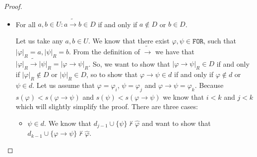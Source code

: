 \documentclass{article}
\theoremstyle{definition}
\theoremstyle{definition}
\theoremstyle{definition}
\newcommand*{\ra}{\rightarrow}
\newcommand*{\FOR}{\texttt{FOR}}
\newcommand{\PC}{$\mathsf{PC}$\xspace}
\begin{document}
\begin{proof}
\begin{itemize}
\begin{itemize}
                        Let us take the proof of $\lnot \varphi \ra \hat{\varphi}$ in $d_{j-1}$ and
                        append to it the proof of $\varphi \ra \hat{\varphi}$ creating a sequence
                        $\Psi$. Then let us append to $\Psi$ a formula $(\varphi \ra \hat{\varphi}) \ra
                            ((\lnot \varphi \ra \hat{\varphi} ) \ra \hat \varphi)$, which is an instance of
                        a \PC axiom $(\alpha \ra \beta) \ra ((\lnot \alpha \ra \beta) \ra \beta)$.
                        Then, by \emph{modus ponens} we can infer $(\lnot \varphi \ra \hat{\varphi} )
                            \ra \hat \varphi$ and then $\hat{\varphi}$ thus proving that $d_{j-1} \vdash
                            \hat{\varphi}$. But this is a contradiction, because we know that $d_{j-1} \not
                            \vdash \hat{\varphi}$. So our assumption that $d_{j-1} \cup \{\lnot \varphi\}
                            \vdash \hat{\varphi}$ was false, so $\varphi_j \in d_j$.
              \end{itemize}

              We can see that if $i > j$ the proof will be analogous.

        \item For all $a, b \in U: a \tilde{\ra}b \in D$ if and only if $a \not \in D$ or $b
                  \in D$.

              Let us take any $a, b \in U$. We know that there exist $\varphi, \psi \in
                  \FOR$, such that $|\varphi|_R = a, |\psi|_R = b$. From the definition of
              $\tilde{\ra}$ we have that $|\varphi|_R \tilde{\ra} |\psi|_R = |\varphi \ra
                  \psi|_R$. So, we want to show that $|\varphi \ra \psi|_R \in D$ if and only if
              $|\varphi|_R \not \in D$ or $|\psi|_R \in D$, so to show that $\varphi \ra \psi
                  \in d$ if and only if $\varphi \not \in d$ or $\psi \in d$. Let us assume that
              $\varphi = \varphi_i$, $\psi = \varphi_j$ and $\varphi \ra \psi = \varphi_k$.
              Because $s(\varphi) < s(\varphi \ra \psi)$ and $s(\psi) < s(\varphi \ra \psi)$
              we know that $i < k$ and $j < k$ which will slightly simplify the proof. There
              are three cases:
              \begin{itemize}
                  \item $\psi \in d$. We know that $d_{j-1} \cup \{\psi\} \not \vdash \hat{\varphi}$ and want to show that $d_{k-1} \cup \{\varphi \ra \psi\} \not \vdash \hat{\varphi}$.


\end{itemize}
\end{itemize}
\end{proof}
\end{document}
